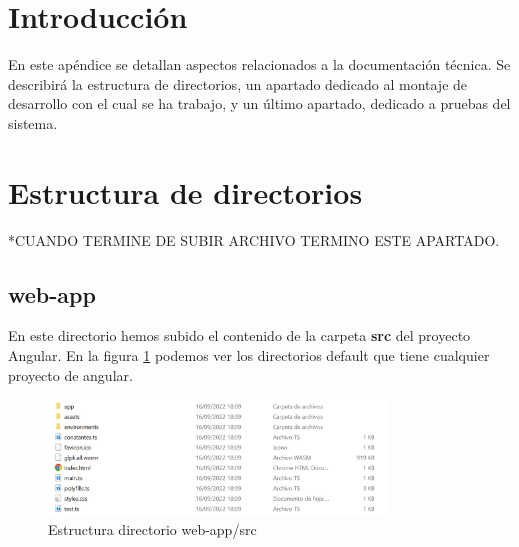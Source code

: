 
\section{Introducción}

En este apéndice se detallan aspectos relacionados a la documentación técnica. Se describirá la estructura de directorios, un apartado dedicado al montaje de desarrollo con el cual se ha trabajo, y un último apartado, dedicado a pruebas del sistema.

\section{Estructura de directorios}

*CUANDO TERMINE DE SUBIR ARCHIVO TERMINO ESTE APARTADO.

\subsection{web-app}

En este directorio hemos subido el contenido de la carpeta \textbf{src} del proyecto Angular. En la figura \ref{fig:src_angular} podemos ver los directorios default que tiene cualquier proyecto de angular.

\begin{figure}[h!] 
\centering
    \includegraphics[width=0.8\textwidth]{img/src_angular.PNG}
\caption{Estructura directorio web-app/src}
\label{fig:src_angular}
\end{figure}

